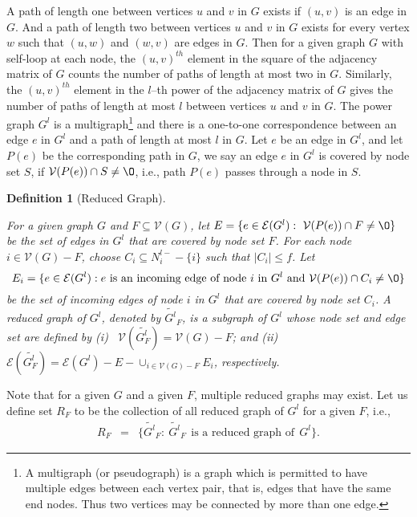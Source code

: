 \documentclass[letterpaper, 11pt]{article}
\newtheorem{definition}{Definition}[section]
\newcommand{\calE}{{\mathcal{E}}}
\newcommand{\calV}{{\mathcal{V}}}
\begin{document}
A path of length one between vertices $u$ and $v$ in $G$ exists if $(u, v)$ is an edge in $G$. And a path of length two between vertices $u$ and $v$ in $G$ exists for every vertex $w$ such that $(u,w)$ and $(w,v)$ are edges in $G$.
Then for a given graph $G$ with self-loop at each node,
the $(u,v)^{th}$ element in the square of the adjacency matrix of $G$ counts the number of paths of length at most two in $G$. Similarly, the $(u,v)^{th}$ element in the $l$--th power of the adjacency matrix of $G$ gives the number of paths of length at most $l$ between vertices $u$ and $v$ in $G$.
The power graph $G^{l}$ is a multigraph\footnote{A multigraph (or pseudograph) is a graph which is permitted to have multiple edges between each vertex pair, that is, edges that have the same end nodes. Thus two vertices may be connected by more than one edge.} and there is a one-to-one correspondence between an edge $e$ in $G^{l}$ and a path of length at most $l$ in $G$. Let $e$ be an edge in $G^l$, and let $P(e)$ be the corresponding path in $G$, we say an edge $e$ in $G^{l}$ is covered by node set $S$, if $\calV(P(e))\cap S\not=\O$, i.e., path $P(e)$ passes through a node in $S$.



\begin{definition}[Reduced Graph]
\label{def:reduced} 

For a given graph $G$ and $F\subseteq\calV(G)$, let $E=\{e\in \calE(G^{l}):~\calV(P(e))\cap F\not=\O\}$ be the set of edges in $G^{l}$ that are covered by node set $F$. For each node $i\in \calV(G)-F$, choose $C_i\subseteq N_i^{l-}-\{i\}$ such that $|C_i|\le f$. Let $$E_i=\{e\in \calE(G^{l}): e~\text{is an incoming edge of node $i$ in}~G^{l}~~ \text{and}~ \calV(P(e))\cap C_i\not=\O\}$$ be the set of incoming edges of node $i$ in $G^{l}$ that are covered by node set $C_i$.
  A reduced graph of $G^l$, denoted by $\widetilde{G^l}_F$, is a subgraph of $G^l$ whose node set and edge set are defined by (i)~ $\calV(\widetilde{G^l_F})=\calV(G)-F$; and
(ii) $\calE(\widetilde{G^l_F})=\calE(G^{l})-E-\cup_{i\in \calV(G)-F}E_i$, respectively.
\end{definition}

Note that for a given $G$ and a given $F$,
multiple reduced graphs may exist.
Let us define set $R_F$ to be the collection of all reduced graph of $G^l$ for a given $F$, i.e.,
\begin{eqnarray}
R_F & = & \{ \widetilde{G^l}_F: ~ \widetilde{G^l}_F ~~\text{is a reduced graph of}~~ G^l \}.
\end{eqnarray}
\end{document}
